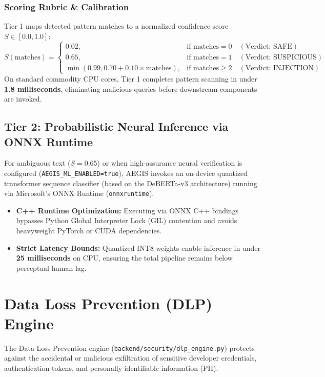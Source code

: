 \subsubsection{Scoring Rubric \& Calibration}
Tier 1 maps detected pattern matches to a normalized confidence score $S \in [0.0, 1.0]$:
\begin{equation}
S(\text{matches}) = \begin{cases} 
0.02, & \text{if } \text{matches} = 0 \quad (\text{Verdict: SAFE}) \\
0.65, & \text{if } \text{matches} = 1 \quad (\text{Verdict: SUSPICIOUS}) \\
\min(0.99, 0.70 + 0.10 \times \text{matches}), & \text{if } \text{matches} \ge 2 \quad (\text{Verdict: INJECTION})
\end{cases}
\end{equation}
On standard commodity CPU cores, Tier 1 completes pattern scanning in under \textbf{1.8 milliseconds}, eliminating malicious queries before downstream components are invoked.

\subsection{Tier 2: Probabilistic Neural Inference via ONNX Runtime}
For ambiguous text ($S = 0.65$) or when high-assurance neural verification is configured (\texttt{AEGIS\_ML\_ENABLED=true}), AEGIS invokes an on-device quantized transformer sequence classifier (based on the DeBERTa-v3 architecture) running via Microsoft's ONNX Runtime (\texttt{onnxruntime}).
\begin{itemize}
    \item \textbf{C++ Runtime Optimization:} Executing via ONNX C++ bindings bypasses Python Global Interpreter Lock (GIL) contention and avoids heavyweight PyTorch or CUDA dependencies.
    \item \textbf{Strict Latency Bounds:} Quantized INT8 weights enable inference in under \textbf{25 milliseconds} on CPU, ensuring the total pipeline remains below perceptual human lag.
\end{itemize}

\section{Data Loss Prevention (DLP) Engine}
The Data Loss Prevention engine (\texttt{backend/security/dlp\_engine.py}) protects against the accidental or malicious exfiltration of sensitive developer credentials, authentication tokens, and personally identifiable information (PII).

